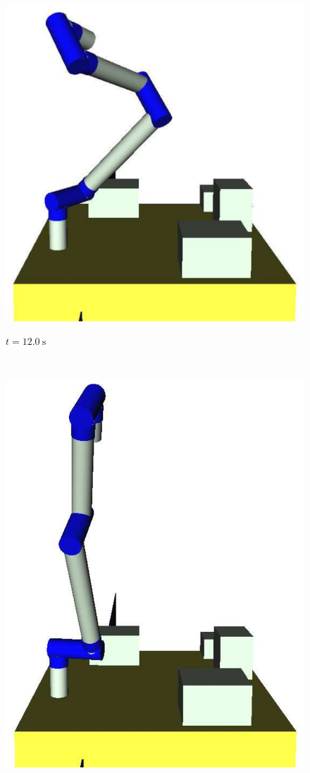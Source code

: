 \begin{figure}[t]
\begin{minipage}[h]{0.28\linewidth}
    \includegraphics[width=1.0\linewidth]{fig/chapter4/deployment/03.eps}
    \centering
    \par\footnotesize{$t = 12.0~\mathrm{s}$}
  \end{minipage}\\
  \vspace{1em}
  \begin{minipage}[h]{0.28\linewidth}
    \includegraphics[width=1.0\linewidth]{fig/chapter4/deployment/04.eps}

\end{minipage}
\end{figure}

